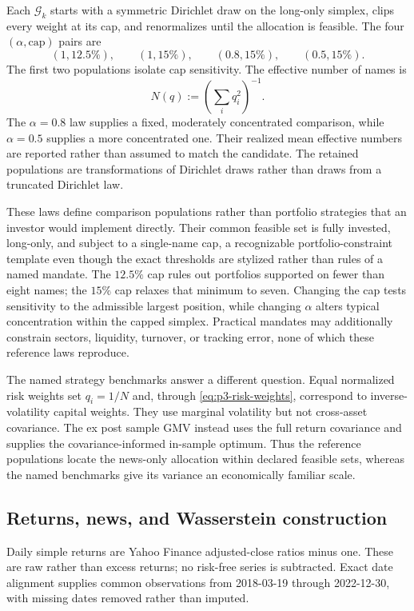 Each $\mathcal G_k$ starts with a symmetric Dirichlet draw on the long-only
simplex, clips every weight at its cap, and renormalizes until the allocation
is feasible.
The four $(\alpha,\mathrm{cap})$ pairs are
\[
  (1,12.5\%),\qquad (1,15\%),\qquad
  (0.8,15\%),\qquad (0.5,15\%).
\]
The first two populations isolate cap sensitivity.
The effective number of names is
\[
  N(q):=\left(\sum_i q_i^2\right)^{-1}.
\]
The $\alpha=0.8$ law supplies a fixed, moderately concentrated comparison,
while $\alpha=0.5$ supplies a more concentrated one.
Their realized mean effective numbers are reported rather than assumed to
match the candidate.
The retained populations are transformations of Dirichlet draws rather than
draws from a truncated Dirichlet law.

These laws define comparison populations rather than portfolio strategies that
an investor would implement directly.
Their common feasible set is fully invested, long-only, and subject to a
single-name cap, a recognizable portfolio-constraint template even though the
exact thresholds are stylized rather than rules of a named mandate.
The $12.5\%$ cap rules out portfolios supported on fewer than eight names; the
$15\%$ cap relaxes that minimum to seven.
Changing the cap tests sensitivity to the admissible largest position, while
changing $\alpha$ alters typical concentration within the capped simplex.
Practical mandates may additionally constrain sectors, liquidity, turnover, or
tracking error, none of which these reference laws reproduce.

The named strategy benchmarks answer a different question.
Equal normalized risk weights set $q_i=1/N$ and, through
\eqref{eq:p3-risk-weights}, correspond to inverse-volatility capital weights.
They use marginal volatility but not cross-asset covariance.
The ex post sample GMV instead uses the full return covariance and supplies the
covariance-informed in-sample optimum.
Thus the reference populations locate the news-only allocation within declared
feasible sets, whereas the named benchmarks give its variance an economically
familiar scale.

\subsection{Returns, news, and Wasserstein construction}
\label{sec:p3-data-construction}

Daily simple returns are Yahoo Finance adjusted-close ratios minus one.
These are raw rather than excess returns; no risk-free series is subtracted.
Exact date alignment supplies  common observations from
2018-03-19 through 2022-12-30, with missing dates removed rather than imputed.

